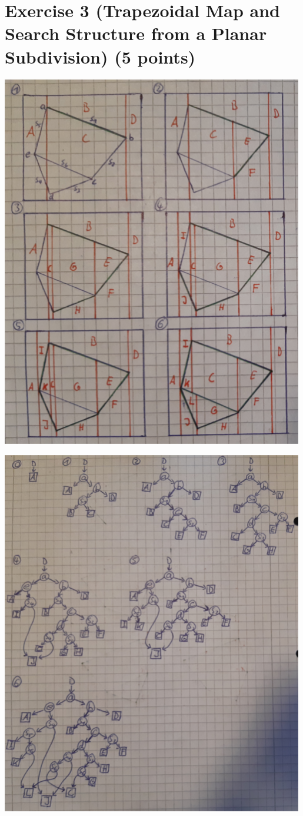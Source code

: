 \documentclass[english, fontsize=12pt, paper=a4, twoside=false, draft=true, pagesize=auto, version=last, DIV=16]{scrartcl}
\theoremstyle{break}
\begin{document}
\newpage

\section*{\large Exercise 3 (Trapezoidal Map and Search Structure from a Planar Subdivision) {\normalsize \hfill (5 points)}}

\begin{center}
  \includegraphics[width=0.99\textwidth]{./images/map.png}
\end{center}

\begin{center}
  \includegraphics[width=0.99\textwidth]{./images/datastructure.png}
\end{center}
\end{document}
